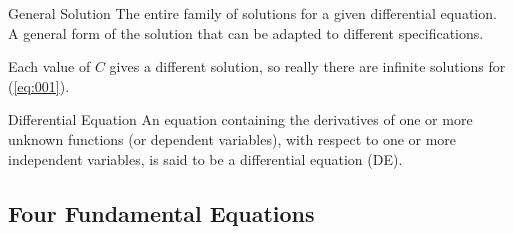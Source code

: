 \documentclass[12pt]{article}
\begin{document}
\begin{definition}{General Solution}
  The entire family of solutions for a given differential equation. A general form of the solution that can be adapted to different specifications.
\end{definition}

Each value of $C$ gives a different solution, so really there are infinite solutions for (\ref{eq:001}).

\begin{definition}{Differential Equation}
  An equation containing the derivatives of one or more unknown functions (or dependent variables), with respect to one or more independent variables, is said to be a differential equation (DE).
\end{definition}

\subsection{Four Fundamental Equations}
\label{ssec:fourFundamentalEquations}
\end{document}

